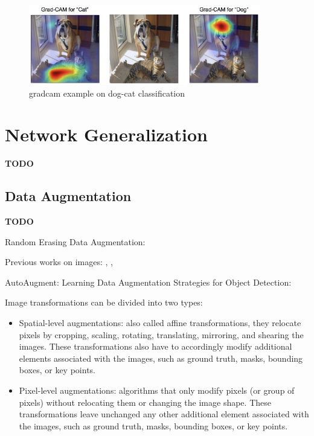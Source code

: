\begin{figure}[!htb]
\centering
\includegraphics[width=0.9\textwidth]{"contents/images/gradcam/02-gradcam-catdog"}
\caption[\gls{gradcam} example on dog-cat classification]{\gls{gradcam} example on dog-cat classification \cite{Selvaraju_2019}}
\label{fig:gradcam-catdog}
\end{figure}




\section{Network Generalization}
\label{sec:network-generalization}

\textbf{TODO}



\subsection{Data Augmentation}
\label{subsec:data-augmentation}

\textbf{TODO}

Random Erasing Data Augmentation: \cite{zhong2017random}

Previous works on images:  \cite{yue2019domain}, \cite{Takahashi_2020}, \cite{xie2020unsupervised}

AutoAugment: \cite{cubuk2019autoaugment}
Learning Data Augmentation Strategies for Object Detection: \cite{zoph2019learning}

\medskip

Image transformations can be divided into two types:
\begin{itemize}
	\item Spatial-level augmentations: also called affine transformations, they relocate pixels by cropping, scaling, rotating, translating, mirroring, and shearing the images. These transformations also have to accordingly modify additional elements associated with the images, such as ground truth, masks, bounding boxes, or key points.
	\item Pixel-level augmentations: algorithms that only modify pixels (or group of pixels) without relocating them or changing the image shape. These transformations leave unchanged any other additional element associated with the images, such as ground truth, masks, bounding boxes, or key points.
\end{itemize}


